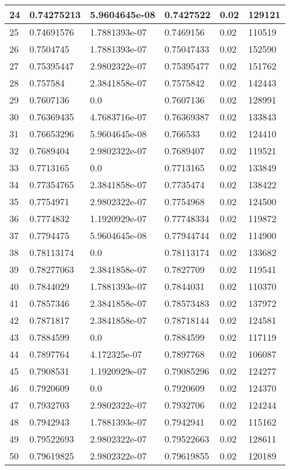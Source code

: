 \begin{longtable}{|l|l|l|l|l|l|}
24 & 0.74275213 & 5.9604645e-08 & 0.7427522 & 0.02 & 129121 \\ \hline 
25 & 0.74691576 & 1.7881393e-07 & 0.7469156 & 0.02 & 110519 \\ \hline 
26 & 0.7504745 & 1.7881393e-07 & 0.75047433 & 0.02 & 152590 \\ \hline 
27 & 0.75395447 & 2.9802322e-07 & 0.75395477 & 0.02 & 151762 \\ \hline 
28 & 0.757584 & 2.3841858e-07 & 0.7575842 & 0.02 & 142443 \\ \hline 
29 & 0.7607136 & 0.0 & 0.7607136 & 0.02 & 128991 \\ \hline 
30 & 0.76369435 & 4.7683716e-07 & 0.76369387 & 0.02 & 133843 \\ \hline 
31 & 0.76653296 & 5.9604645e-08 & 0.766533 & 0.02 & 124410 \\ \hline 
32 & 0.7689404 & 2.9802322e-07 & 0.7689407 & 0.02 & 119521 \\ \hline 
33 & 0.7713165 & 0.0 & 0.7713165 & 0.02 & 133849 \\ \hline 
34 & 0.77354765 & 2.3841858e-07 & 0.7735474 & 0.02 & 138422 \\ \hline 
35 & 0.7754971 & 2.9802322e-07 & 0.7754968 & 0.02 & 124500 \\ \hline 
36 & 0.7774832 & 1.1920929e-07 & 0.77748334 & 0.02 & 119872 \\ \hline 
37 & 0.7794475 & 5.9604645e-08 & 0.77944744 & 0.02 & 114900 \\ \hline 
38 & 0.78113174 & 0.0 & 0.78113174 & 0.02 & 133682 \\ \hline 
39 & 0.78277063 & 2.3841858e-07 & 0.7827709 & 0.02 & 119541 \\ \hline 
40 & 0.7844029 & 1.7881393e-07 & 0.7844031 & 0.02 & 110370 \\ \hline 
41 & 0.7857346 & 2.3841858e-07 & 0.78573483 & 0.02 & 137972 \\ \hline 
42 & 0.7871817 & 2.3841858e-07 & 0.78718144 & 0.02 & 124581 \\ \hline 
43 & 0.7884599 & 0.0 & 0.7884599 & 0.02 & 117119 \\ \hline 
44 & 0.7897764 & 4.172325e-07 & 0.7897768 & 0.02 & 106087 \\ \hline 
45 & 0.7908531 & 1.1920929e-07 & 0.79085296 & 0.02 & 124277 \\ \hline 
46 & 0.7920609 & 0.0 & 0.7920609 & 0.02 & 124370 \\ \hline 
47 & 0.7932703 & 2.9802322e-07 & 0.7932706 & 0.02 & 124244 \\ \hline 
48 & 0.7942943 & 1.7881393e-07 & 0.7942941 & 0.02 & 115162 \\ \hline 
49 & 0.79522693 & 2.9802322e-07 & 0.79522663 & 0.02 & 128611 \\ \hline 
50 & 0.79619825 & 2.9802322e-07 & 0.79619855 & 0.02 & 120189 \\ \hline 
\end{longtable}